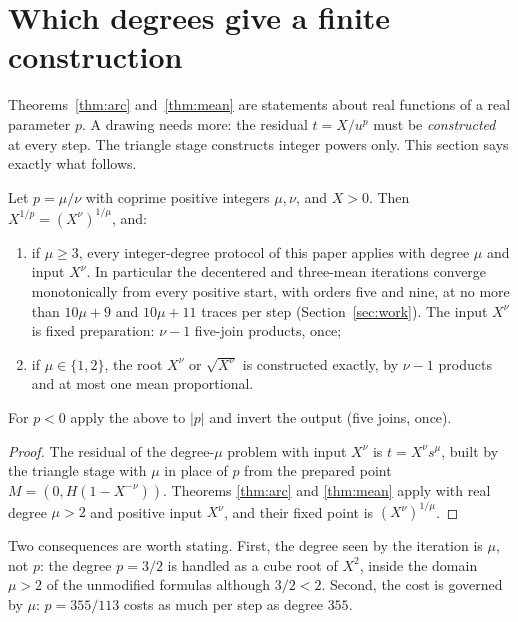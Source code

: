 \section{Which degrees give a finite construction}\label{sec:degrees}

Theorems~\ref{thm:arc} and~\ref{thm:mean} are statements about real functions of a real parameter $p$.
A drawing needs more: the residual $t=X/u^{p}$ must be \emph{constructed} at every step. The triangle
stage constructs integer powers only. This section says exactly what follows.

\begin{proposition}\label{prop:rational}
Let $p=\mu/\nu$ with coprime positive integers $\mu,\nu$, and $X>0$. Then $X^{1/p}=(X^{\nu})^{1/\mu}$,
and:
\begin{enumerate}[label=(\roman*)]
\item if $\mu\ge3$, every integer-degree protocol of this paper applies with degree $\mu$ and input
  $X^{\nu}$. In particular the decentered and three-mean iterations converge monotonically from every
  positive start, with orders five and nine, at no more than $10\mu+9$ and $10\mu+11$ traces per step
  (Section~\ref{sec:work}). The input $X^{\nu}$ is fixed preparation: $\nu-1$ five-join products, once;
\item if $\mu\in\{1,2\}$, the root $X^{\nu}$ or $\sqrt{X^{\nu}}$ is constructed exactly, by $\nu-1$
  products and at most one mean proportional.
\end{enumerate}
For $p<0$ apply the above to $|p|$ and invert the output (five joins, once).
\end{proposition}
\begin{proof}
The residual of the degree-$\mu$ problem with input $X^{\nu}$ is $t=X^{\nu}s^{\mu}$, built by the
triangle stage with $\mu$ in place of $p$ from the prepared point $M=(0,H(1-X^{-\nu}))$. Theorems
\ref{thm:arc} and \ref{thm:mean} apply with real degree $\mu>2$ and positive input $X^{\nu}$, and their
fixed point is $(X^{\nu})^{1/\mu}$.
\end{proof}

Two consequences are worth stating. First, the degree seen by the iteration is $\mu$, not $p$: the
degree $p=3/2$ is handled as a cube root of $X^{2}$, inside the domain $\mu>2$ of the unmodified
formulas although $3/2<2$. Second, the cost is governed by $\mu$: $p=355/113$ costs as much per step
as degree $355$.

